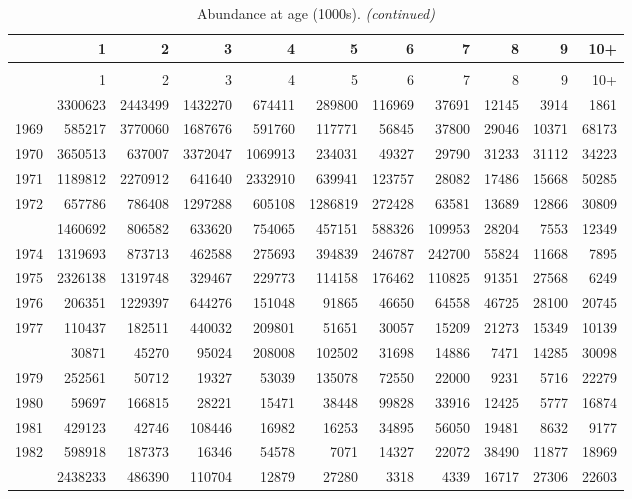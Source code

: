 \documentclass[
]{article}
\begin{document}
\begin{longtable}[t]{lrrrrrrrrrr}
\caption{\label{tab:NAA-table}Abundance at age (1000s).}\\
\toprule
  & 1 & 2 & 3 & 4 & 5 & 6 & 7 & 8 & 9 & 10+\\
\midrule
\endfirsthead
\caption[]{Abundance at age (1000s). \textit{(continued)}}\\
\toprule
  & 1 & 2 & 3 & 4 & 5 & 6 & 7 & 8 & 9 & 10+\\
\midrule
\endhead

\endfoot
\bottomrule
\endlastfoot
1968 & 3300623 & 2443499 & 1432270 & 674411 & 289800 & 116969 & 37691 & 12145 & 3914 & 1861\\
1969 & 585217 & 3770060 & 1687676 & 591760 & 117771 & 56845 & 37800 & 29046 & 10371 & 68173\\
1970 & 3650513 & 637007 & 3372047 & 1069913 & 234031 & 49327 & 29790 & 31233 & 31112 & 34223\\
1971 & 1189812 & 2270912 & 641640 & 2332910 & 639941 & 123757 & 28082 & 17486 & 15668 & 50285\\
1972 & 657786 & 786408 & 1297288 & 605108 & 1286819 & 272428 & 63581 & 13689 & 12866 & 30809\\
\addlinespace
1973 & 1460692 & 806582 & 633620 & 754065 & 457151 & 588326 & 109953 & 28204 & 7553 & 12349\\
1974 & 1319693 & 873713 & 462588 & 275693 & 394839 & 246787 & 242700 & 55824 & 11668 & 7895\\
1975 & 2326138 & 1319748 & 329467 & 229773 & 114158 & 176462 & 110825 & 91351 & 27568 & 6249\\
1976 & 206351 & 1229397 & 644276 & 151048 & 91865 & 46650 & 64558 & 46725 & 28100 & 20745\\
1977 & 110437 & 182511 & 440032 & 209801 & 51651 & 30057 & 15209 & 21273 & 15349 & 10139\\
\addlinespace
1978 & 30871 & 45270 & 95024 & 208008 & 102502 & 31698 & 14886 & 7471 & 14285 & 30098\\
1979 & 252561 & 50712 & 19327 & 53039 & 135078 & 72550 & 22000 & 9231 & 5716 & 22279\\
1980 & 59697 & 166815 & 28221 & 15471 & 38448 & 99828 & 33916 & 12425 & 5777 & 16874\\
1981 & 429123 & 42746 & 108446 & 16982 & 16253 & 34895 & 56050 & 19481 & 8632 & 9177\\
1982 & 598918 & 187373 & 16346 & 54578 & 7071 & 14327 & 22072 & 38490 & 11877 & 18969\\
\addlinespace
1983 & 2438233 & 486390 & 110704 & 12879 & 27280 & 3318 & 4339 & 16717 & 27306 & 22603\\

\end{longtable}
\end{document}
